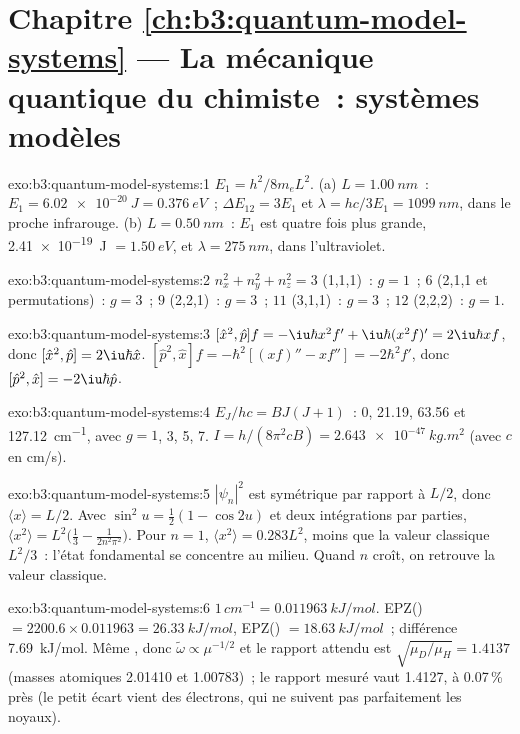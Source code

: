 \section*{Chapitre \ref{ch:b3:quantum-model-systems} --- La mécanique quantique du chimiste~: systèmes modèles}

\begin{solution}{exo:b3:quantum-model-systems:1}
$E_1 = h^2/8m_eL^2$. (a) $L = \qty{1.00}{nm}$~: $E_1 = \qty{6.02e-20}{J} =
\qty{0.376}{eV}$~; $\Delta E_{12} = 3E_1$ et $\lambda = hc/3E_1 =
\qty{1099}{nm}$, dans le proche infrarouge. (b) $L = \qty{0.50}{nm}$~:
$E_1$ est quatre fois plus grande, \qty{2.41e-19}{J} $= \qty{1.50}{eV}$, et $\lambda =
\qty{275}{nm}$, dans l'ultraviolet.
\end{solution}

\begin{solution}{exo:b3:quantum-model-systems:2}
$n_x^2 + n_y^2 + n_z^2 = 3$ (1,1,1)~: $g = 1$~; $6$ (2,1,1 et permutations)~:
$g = 3$~; $9$ (2,2,1)~: $g = 3$~; $11$ (3,1,1)~: $g = 3$~; $12$ (2,2,2)~: $g = 1$.
\end{solution}

\begin{solution}{exo:b3:quantum-model-systems:3}
$[\hat x^2,\hat p]f = -\iu\hbar x^2f' + \iu\hbar(x^2f)' = 2\iu\hbar xf$, donc
$[\hat x^2,\hat p] = 2\iu\hbar\hat x$. $[\hat p^2,\hat x]f = -\hbar^2[(xf)'' -
xf''] = -2\hbar^2f'$, donc $[\hat p^2,\hat x] = -2\iu\hbar\hat p$.
\end{solution}

\begin{solution}{exo:b3:quantum-model-systems:4}
$E_J/hc = BJ(J+1)$~: 0, 21.19, 63.56 et \qty{127.12}{cm^{-1}}, avec $g = 1$,
3, 5, 7. $I = h/(8\pi^2cB) = \qty{2.643e-47}{kg.m^2}$ (avec $c$ en
\unit{cm/s}).
\end{solution}

\begin{solution}{exo:b3:quantum-model-systems:5}
$|\psi_n|^2$ est symétrique par rapport à $L/2$, donc $\langle x\rangle = L/2$.
Avec $\sin^2u = \frac12(1 - \cos2u)$ et deux intégrations par parties,
$\langle x^2\rangle = L^2\big(\frac13 - \frac{1}{2n^2\pi^2}\big)$. Pour $n = 1$,
$\langle x^2\rangle = 0.283L^2$, moins que la valeur classique $L^2/3$~:
l'état fondamental se concentre au milieu. Quand $n$ croît, on retrouve la
valeur classique.
\end{solution}

\begin{solution}{exo:b3:quantum-model-systems:6}
$1\,\unit{cm^{-1}} = \qty{0.011963}{kJ/mol}$. EPZ() $= 2200.6 \times
0.011963 = \qty{26.33}{kJ/mol}$, EPZ() $= \qty{18.63}{kJ/mol}$~;
différence
\qty{7.69}{kJ/mol}. Même , donc $\tilde\omega \propto \mu^{-1/2}$
et le rapport attendu est $\sqrt{\mu_D/\mu_H} = 1.4137$ (masses atomiques
2.01410 et 1.00783)~; le rapport mesuré vaut 1.4127, à 0.07\,\% près (le
petit écart vient des électrons, qui ne suivent pas parfaitement les
noyaux).
\end{solution}

